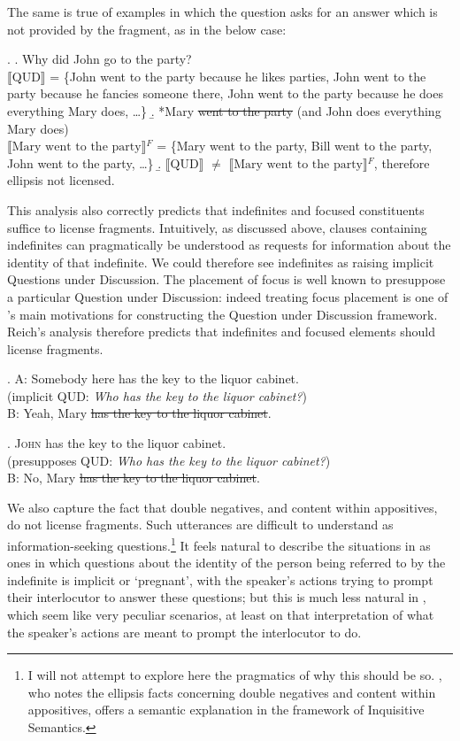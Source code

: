 \documentclass[doublespace]{umthesis}
\newcommand{\ext}[1]{\ensuremath{\llbracket \textrm{{#1}} \rrbracket}}
\begin{document}
The same is true of examples in which the question asks for an answer which is not provided by the fragment, as in the below case:

\ex. 	\a. Why did John go to the party?\\
		\ext{QUD} = \{John went to the party because he likes parties, John went to the party because he fancies someone there, John went to the party because he does everything Mary does, \ldots\}
	\b. *Mary \sout{went to the party} (and John does everything Mary does)\\
		\ext{Mary went to the party}$^F$ = \{Mary went to the party, Bill went to the party, John went to the party, \ldots\}
	\b. \ext{QUD} $\neq$ \ext{Mary went to the party}$^F$, therefore ellipsis not licensed.
	
This analysis also correctly predicts that indefinites and focused constituents suffice to license fragments. Intuitively, as discussed above, clauses containing indefinites can pragmatically be understood as requests for information about the identity of that indefinite.  We could therefore see indefinites as raising implicit Questions under Discussion. The placement of focus is well known to presuppose a particular Question under Discussion: indeed treating focus placement is one of \cite{RoQUD}'s main motivations for constructing the Question under Discussion framework. Reich's analysis therefore predicts that indefinites and focused elements should license fragments.

\ex. 	A: Somebody here has the key to the liquor cabinet.\\
		(implicit QUD: {\it Who has the key to the liquor cabinet?})\\
	B: Yeah, Mary \sout{has the key to the liquor cabinet}.
	
\ex. 	\textsc{John} has the key to the liquor cabinet.\\
		(presupposes QUD: {\it Who has the key to the liquor cabinet?})\\
	B: No, Mary \sout{has the key to the liquor cabinet}.
	
We also capture the fact that double negatives, and content within appositives, do not license fragments. Such utterances are difficult to understand as information-seeking questions.\footnote{I will not attempt to explore here the pragmatics of why this should be so. \cite{AB10}, who notes the ellipsis facts concerning double negatives and content within appositives, offers a semantic explanation in the framework of Inquisitive Semantics.} It feels natural to describe the situations in \Next as ones in which questions about the identity of the person being referred to by the indefinite is implicit or `pregnant', with the speaker's actions trying to prompt their interlocutor to answer these questions; but this is much less natural in \NNext, which seem like very peculiar scenarios, at least on that interpretation of what the speaker's actions are meant to prompt the interlocutor to do.
\end{document}
